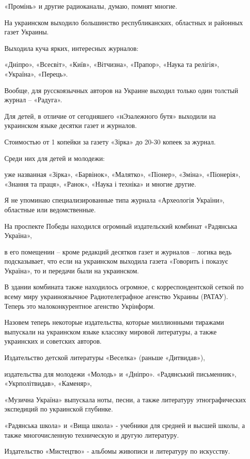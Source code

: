 \documentclass[a4paper,11pt]{extreport}
\begin{document}
\begin{itemize}
«Промінь» и другие радиоканалы, думаю, помнят многие.

На украинском выходило большинство республиканских, областных и районных газет Украины.

Выходила куча ярких, интересных журналов:

«Дніпро»,
«Всесвіт»,
«Київ»,
«Вітчизна»,
«Прапор»,
«Наука та релігія»,
«Україна»,
«Перець».

Вообще, для русскоязычных авторов на Украине выходил только один толстый журнал – «Радуга».

Для детей, в отличие от сегодняшего «нЭзалежного бутя» выходили на украинском языке десятки газет и журналов.

Стоимостью
от 1 копейки за газету «Зірка»
до 20-30 копеек за журнал.

Среди них для детей и молодежи:

уже названная «Зірка»,
«Барвінок»,
«Малятко»,
«Піонер»,
«Зміна»,
«Піонерія»,
«Знання та праця»,
«Ранок»,
«Наука і техніка»
и многие другие.

Я не упоминаю
специализированные типа журнала «Археологія України»,
областные или ведомственные.

На проспекте Победы находился огромный издательский комбинат «Радянська Україна»,

в его помещении – кроме редакций десятков газет и журналов – логика ведь подсказывает, что если на украинском выходила газета «Говорить і показує Україна», то и передачи были на украинском.

В здании комбината также находилось огромное, с корреспондентской сеткой по всему миру украиноязычное Радиотелеграфное агенство Украины (РАТАУ).
Теперь это малоконкурентное агенство Укрінформ.

Назовем теперь некоторые издательства, которые миллионными тиражами выпускали на украинском языке классику мировой литературы, а также украинских и советских авторов.

Издательство детской литературы «Веселка» (раньше «Дитвидав»),

издательства для молодежи
«Молодь» и
«Дніпро».
«Радянський письменник», «Укрполітвидав»,
«Каменяр»,

«Музична Україна» выпускала ноты, песни,
а также литературу этнографических экспедиций по украинской глубинке.

«Радянська школа» и «Вища школа» - учебники для средней и высшей школы, а также многочисленную техническую и другую литературу.

Издательство «Мистецтво» - альбомы живописи и литературу по искусству.


\end{itemize}
\end{document}
